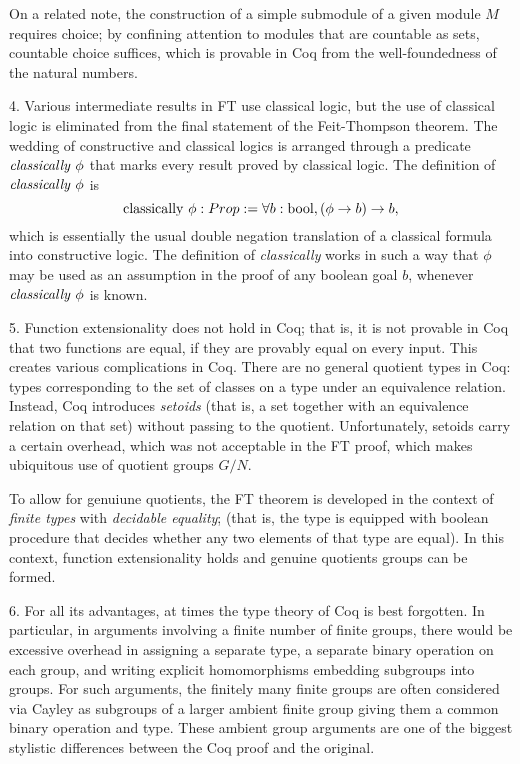 \documentclass[brochure,english,12pt]{bourbaki}
\theoremstyle{plain}
\def\op#1{{\operatorname{#1}}}
\begin{document}
On a related note, the construction of a simple submodule of a given module $M$ requires choice;
by confining attention to modules that are countable as sets, countable choice suffices, which 
is provable in Coq from the well-foundedness of the natural numbers.


4.  Various intermediate results in FT use classical logic, but the use of classical
logic is eliminated from the final statement of the Feit-Thompson theorem.  The wedding of constructive and
classical logics is  arranged
through a predicate $\op{\it classically}~\phi$ that marks every result proved by classical logic.
The definition of $\op{\it classically}~\phi$ is
\[
\op{classically}~\phi : Prop := \forall {b:\bool}, (\phi\to b) \to b,
\]
which is essentially the usual double negation translation of a classical formula into
constructive logic.  The definition of {\it classically} works in such a way that $\phi$ may
be used as an assumption in the proof of any boolean goal $b$, whenever $\op{\it classically}~\phi$ is known.

5.  Function extensionality does not hold in Coq; that is, it is not provable in Coq
that two functions are equal, if they are provably equal on every input.  This creates various
complications in Coq.  There are no general quotient types in Coq: types corresponding
to the set of classes on a type under an equivalence relation.  Instead, Coq introduces {\it setoids} 
(that is, a set together 
with an equivalence relation on that set) without passing to the quotient.  Unfortunately, setoids carry a certain
overhead, which was not acceptable in the FT proof, which makes ubiquitous use of quotient
groups $G/N$.   

To allow for genuiune quotients, the FT theorem is developed in the context of {\it finite types} with {\it decidable equality};
(that is, the type is equipped with boolean procedure that decides whether any two elements of that type are equal).
In this context, function extensionality holds and genuine quotients groups can be formed.


6.  For all its advantages, at times the type theory of Coq is best forgotten.  In particular,
in arguments involving a finite number of finite groups, there would be excessive overhead in
assigning a separate type, a separate binary operation on each group, 
and writing explicit homomorphisms embedding subgroups into groups.
 For such arguments, the finitely many finite groups are
often considered via Cayley as subgroups of a larger ambient finite group giving them a common binary
operation and type.  These ambient group arguments are one of the biggest stylistic differences
between the Coq proof and the original.
\end{document}
